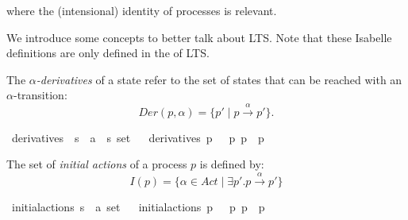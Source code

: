 \begin{isabellebody}
\begin{isamarkuptext}
where the (intensional) identity of processes is relevant.%
\end{isamarkuptext}\isamarkuptrue%
%
\begin{isamarkuptext}%
We introduce some concepts to better talk about LTS. Note that these Isabelle definitions are only defined in the  of LTS.%
\end{isamarkuptext}\isamarkuptrue%
%
\isadelimdocument
%
\endisadelimdocument
%
\isatagdocument
%
\isamarkuptrue%
%
\endisatagdocument
{\isafolddocument}%
%
\isadelimdocument
%
\endisadelimdocument
%
\begin{isamarkuptext}%
The \textit{$\alpha$-derivatives} of a state refer to the set of states that can be reached with an $\alpha$-transition:
$$\mathit{Der} (p, \alpha) = \{ p' \mid p \xrightarrow{\alpha} p' \}.$$%
\end{isamarkuptext}\isamarkuptrue%
\isamarkupfalse%
\ derivatives\ {\isacharcolon}{\kern0pt}{\isacharcolon}{\kern0pt}\ {\isacartoucheopen}{\isacharprime}{\kern0pt}s\ {\isasymRightarrow}\ {\isacharprime}{\kern0pt}a\ {\isasymRightarrow}\ {\isacharprime}{\kern0pt}s\ set{\isacartoucheclose}\isanewline
\ \ \isanewline
{\isacartoucheopen}derivatives\ p\ {\isasymalpha}\ {\isasymequiv}\ {\isacharbraceleft}{\kern0pt}p{\isacharprime}{\kern0pt}{\isachardot}{\kern0pt}\ p\ {\isasymmapsto}{\isasymalpha}\ p{\isacharprime}{\kern0pt}{\isacharbraceright}{\kern0pt}{\isacartoucheclose}%
\begin{isamarkuptext}%
The set of \textit{initial actions} of a process $p$ is defined by: 
$$I(p)=\{\alpha \in Act \mid \exists p'. p \xrightarrow{\alpha} p'\}$$%
\end{isamarkuptext}\isamarkuptrue%
\isamarkupfalse%
\ initial{\isacharunderscore}{\kern0pt}actions{\isacharcolon}{\kern0pt}{\isacharcolon}{\kern0pt}\ {\isacartoucheopen}{\isacharprime}{\kern0pt}s\ {\isasymRightarrow}\ {\isacharprime}{\kern0pt}a\ set{\isacartoucheclose}\isanewline
\ \ \isanewline
{\isacartoucheopen}initial{\isacharunderscore}{\kern0pt}actions\ p\ {\isasymequiv}\ {\isacharbraceleft}{\kern0pt}{\isasymalpha}{\isacharbar}{\kern0pt}{\isasymalpha}{\isachardot}{\kern0pt}\ {\isacharparenleft}{\kern0pt}{\isasymexists}p{\isacharprime}{\kern0pt}{\isachardot}{\kern0pt}\ p\ {\isasymmapsto}{\isasymalpha}\ p{\isacharprime}{\kern0pt}{\isacharparenright}{\kern0pt}{\isacharbraceright}{\kern0pt}{\isacartoucheclose}%
\begin{isamarkuptext}%

\end{isamarkuptext}
\end{isabellebody}
